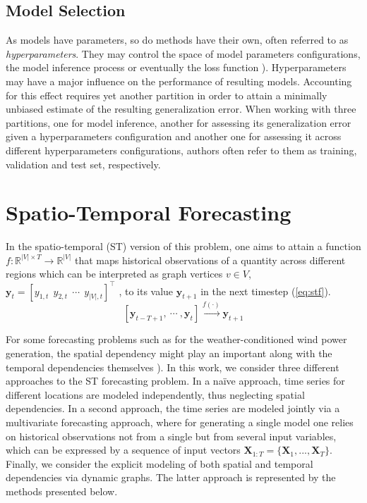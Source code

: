 \subsection{Model Selection}

As models have parameters, so do methods have their own, often referred to as \textit{hyperparameters}. They may control the space of model parameters configurations, the model inference process or eventually the loss function \cite{hutter2019automated}). Hyperparameters may have a major influence on the performance of resulting models. Accounting for this effect requires yet another partition in order to attain a minimally unbiased estimate of the resulting generalization error. When working with three partitions, one for model inference, another for assessing its generalization error given a hyperparameters configuration and another one for assessing it across different hyperparameters configurations, authors often refer to them as training, validation and test set, respectively.

\section{Spatio-Temporal Forecasting}\label{sec:stf}

In the spatio-temporal (ST) version of this problem, one aims to attain a function $f: \mathbb{R}^{|V|\times T} \rightarrow \mathbb{R}^{|V|}$ that maps historical observations of a quantity across different regions which can be interpreted as graph vertices $v\in V$, $\boldsymbol{y}_t = [y_{1,t}\  \  y_{2,t}\ \ \cdots \ \ y_{|V|,t}]^\top$ ,  to its value $\boldsymbol{y}_{t+1}$ in the next timestep  (\ref{eq:stf}).
\begin{equation}\label{eq:stf}
    [\boldsymbol{y}_{t-T+1}, \  \cdots\ , \boldsymbol{y}_{t}] \xrightarrow{f(\cdot)} \boldsymbol{y}_{t+1}
\end{equation}

For some forecasting problems such as for the weather-conditioned wind power generation, the spatial dependency might play an important along with the temporal dependencies themselves \cite{engeland2017variability}). In this work, we consider three different approaches to the ST forecasting problem. In a naïve approach, time series for different locations are modeled independently, thus neglecting spatial dependencies. In a second approach, the time series are modeled jointly via a multivariate forecasting approach, where for generating a single model one relies on historical observations not from a single but from several input variables, which can be expressed by a sequence of input vectors $\boldsymbol{X}_{1:T} = \{\boldsymbol{X}_1, ..., \boldsymbol{X}_T\}$.  Finally, we consider the explicit modeling of both spatial and temporal dependencies via dynamic graphs. The latter approach is represented by the methods presented below.


